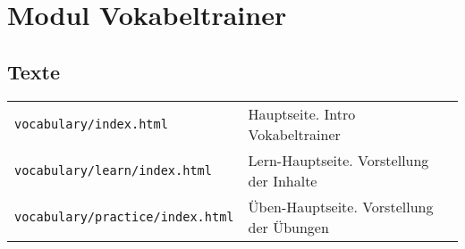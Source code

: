 

\section{Modul Vokabeltrainer}
\subsection{Texte}
\begin{tabular}{ | p{} | p{} | } 
	\texttt{vocabulary/index.html}	& Hauptseite. Intro Vokabeltrainer\\
	\texttt{vocabulary/learn/index.html}	& Lern-Hauptseite. Vorstellung der Inhalte\\
	\texttt{vocabulary/practice/index.html}	& Üben-Hauptseite. Vorstellung der Übungen\\
\end{tabular}

